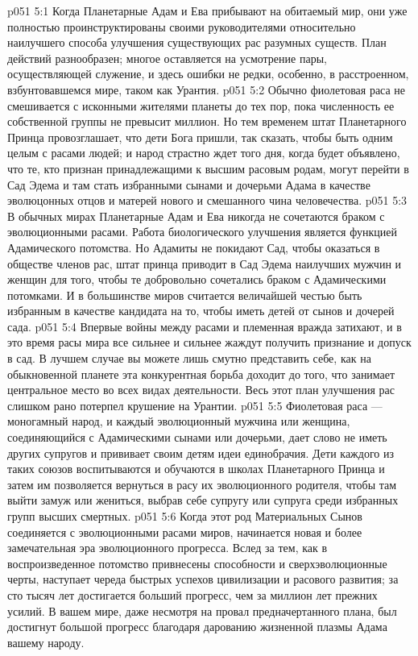 \vs p051 5:1 Когда Планетарные Адам и Ева прибывают на обитаемый мир, они уже полностью проинструктированы своими руководителями относительно наилучшего способа улучшения существующих рас разумных существ. План действий разнообразен; многое оставляется на усмотрение пары, осуществляющей служение, и здесь ошибки не редки, особенно, в расстроенном, взбунтовавшемся мире, таком как Урантия.
\vs p051 5:2 Обычно фиолетовая раса не смешивается с исконными жителями планеты до тех пор, пока численность ее собственной группы не превысит миллион. Но тем временем штат Планетарного Принца провозглашает, что дети Бога пришли, так сказать, чтобы быть одним целым с расами людей; и народ страстно ждет того дня, когда будет объявлено, что те, кто признан принадлежащими к высшим расовым родам, могут перейти в Сад Эдема и там стать избранными сынами и дочерьми Адама в качестве эволюцонных отцов и матерей нового и смешанного чина человечества.
\vs p051 5:3 В обычных мирах Планетарные Адам и Ева никогда не сочетаются браком с эволюционными расами. Работа биологического улучшения является функцией Адамического потомства. Но Адамиты не покидают Сад, чтобы оказаться в обществе членов рас, штат принца приводит в Сад Эдема наилучших мужчин и женщин для того, чтобы те добровольно сочетались браком с Адамическими потомками. И в большинстве миров считается величайшей честью быть избранным в качестве кандидата на то, чтобы иметь детей от сынов и дочерей сада.
\vs p051 5:4 Впервые войны между расами и племенная вражда затихают, и в это время расы мира все сильнее и сильнее жаждут получить признание и допуск в сад. В лучшем случае вы можете лишь смутно представить себе, как на обыкновенной планете эта конкурентная борьба доходит до того, что занимает центральное место во всех видах деятельности. Весь этот план улучшения рас слишком рано потерпел крушение на Урантии.
\vs p051 5:5 \pc Фиолетовая раса --- моногамный народ, и каждый эволюционный мужчина или женщина, соединяющийся с Адамическими сынами или дочерьми, дает слово не иметь других супругов и прививает своим детям идеи единобрачия. Дети каждого из таких союзов воспитываются и обучаются в школах Планетарного Принца и затем им позволяется вернуться в расу их эволюционного родителя, чтобы там выйти замуж или жениться, выбрав себе супругу или супруга среди избранных групп высших смертных.
\vs p051 5:6 Когда этот род Материальных Сынов соединяется с эволюционными расами миров, начинается новая и более замечательная эра эволюционного прогресса. Вслед за тем, как в воспроизведенное потомство привнесены способности и сверхэволюционные черты, наступает череда быстрых успехов цивилизации и расового развития; за сто тысяч лет достигается больший прогресс, чем за миллион лет прежних усилий. В вашем мире, даже несмотря на провал предначертанного плана, был достигнут большой прогресс благодаря дарованию жизненной плазмы Адама вашему народу.
